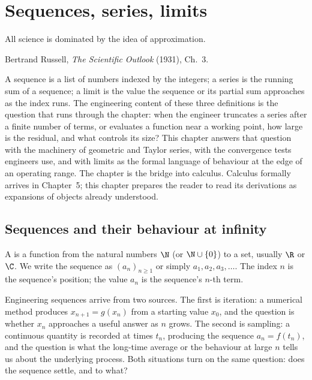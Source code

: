 \chapter{Sequences, series, limits}
\label{vol02:ch04}

\epigraph{All science is dominated by the idea of approximation.}{Bertrand
Russell, \emph{The Scientific Outlook} (1931), Ch.~3.}


\noindent
A sequence is a list of numbers indexed by the integers; a series is the
running sum of a sequence; a limit is the value the sequence or its
partial sum approaches as the index runs. The engineering content of
these three definitions is the question that runs through the chapter:
when the engineer truncates a series after a finite number of terms, or
evaluates a function near a working point, how large is the residual,
and what controls its size? This chapter answers that question with the
machinery of geometric and Taylor series, with the convergence tests
engineers use, and with limits as the formal language of behaviour at
the edge of an operating range. The chapter is the bridge into calculus.
Calculus formally arrives in Chapter~5; this chapter prepares the reader
to read its derivations as expansions of objects already understood.

\section{Sequences and their behaviour at infinity}

A  is a function from the natural numbers $\N$ (or
$\N \cup \{0\}$) to a set, usually $\R$ or $\C$. We write the sequence
as $(a_{n})_{n \geq 1}$ or simply $a_{1}, a_{2}, a_{3}, \ldots$. The
index $n$ is the sequence's position; the value $a_{n}$ is the
sequence's $n$-th term.

Engineering sequences arrive from two sources. The first is iteration:
a numerical method produces $x_{n+1} = g(x_{n})$ from a starting value
$x_{0}$, and the question is whether $x_{n}$ approaches a useful answer
as $n$ grows. The second is sampling: a continuous quantity is recorded
at times $t_{n}$, producing the sequence $a_{n} = f(t_{n})$, and the
question is what the long-time average or the behaviour at large $n$
tells us about the underlying process. Both situations turn on the
same question: does the sequence settle, and to what?

